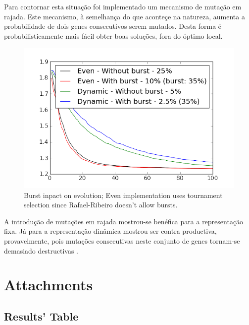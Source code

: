 \documentclass[a4paper]{article}
\begin{document}
\indent Para contornar esta situação foi implementado um mecanismo de mutação em rajada. Este mecanismo, à semelhança
do que aconteçe na natureza, aumenta a probabilidade de dois genes consecutivos serem mutados. Desta forma é probabilisticamente
mais fácil obter boas soluções, fora do óptimo local. 

\begin{figure}[ht]
	\centering
	\includegraphics[scale=1]{images/burst.png}
	\caption{Burst inpact on evolution; Even implementation uses tournament selection since Rafael-Ribeiro doesn't allow bursts.}
	\label{fig:gui}
\end{figure}

\indent A introdução de mutações em rajada mostrou-se benéfica para a representação fixa. Já para a representação
dinâmica mostrou ser contra productiva, provavelmente, pois mutações consecutivas neste conjunto de genes tornam-se demasiado destructivas .

\cleardoublepage

\eject \pdfpagewidth=594.0mm \pdfpageheight=420.0mm
\paperwidth=594.0mm
\paperheight=420.0mm

\section{Attachments}

\subsection{Results' Table}
\label{sec:results}
\begin{center}
	
\end{center}
\end{document}
